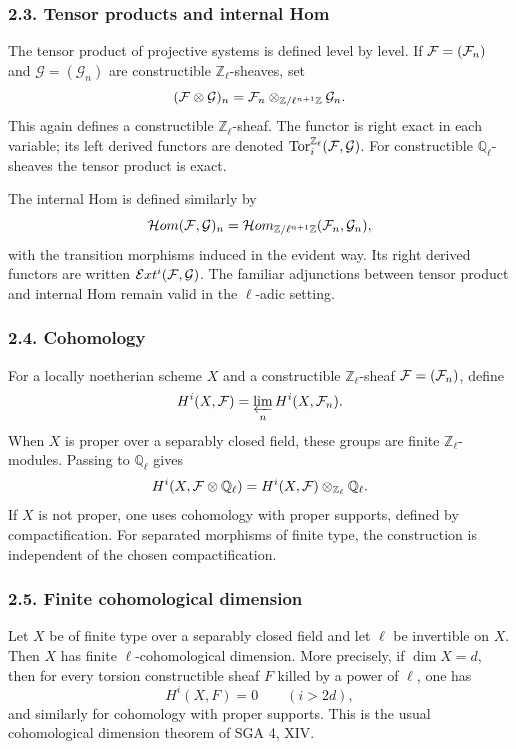 \documentclass[11pt]{article}
\theoremstyle{plain}
\theoremstyle{definition}
\theoremstyle{remark}
\newcommand{\bQ}{\mathbb Q}
\newcommand{\bZ}{\mathbb Z}
\newcommand{\cG}{\mathcal G}\newcommand{\cH}{\mathcal H}\newcommand{\cI}{\mathcal I}
\DeclareMathOperator{\Tor}{Tor}
\begin{document}
\subsubsection*{2.3. Tensor products and internal Hom}

The tensor product of projective systems is defined level by level. If
$\mathcal F=(\mathcal F_n)$ and $\cG=(\cG_n)$ are constructible $\bZ_\ell$-sheaves, set
\[
      (\cF\otimes\cG)_n=\cF_n\otimes_{\bZ/\ell^{n+1}\bZ}\cG_n.
\]
This again defines a constructible $\bZ_\ell$-sheaf. The functor is right exact in
each variable; its left derived functors are denoted $\Tor_i^{\bZ_\ell}(\cF,\cG)$.
For constructible $\bQ_\ell$-sheaves the tensor product is exact.

The internal Hom is defined similarly by
\[
      \cH om(\cF,\cG)_n=
      \cH om_{\bZ/\ell^{n+1}\bZ}(\cF_n,\cG_n),
\]
with the transition morphisms induced in the evident way. Its right derived functors
are written $\mathcal Ext^i(\cF,\cG)$. The familiar adjunctions between tensor
product and internal Hom remain valid in the $\ell$-adic setting.

\subsubsection*{2.4. Cohomology}

For a locally noetherian scheme $X$ and a constructible $\bZ_\ell$-sheaf
$\mathcal F=(\mathcal F_n)$, define
\[
      H^i(X,\mathcal F)=\varprojlim_n H^i(X,\mathcal F_n).
\]
When $X$ is proper over a separably closed field, these groups are finite
$\bZ_\ell$-modules. Passing to $\bQ_\ell$ gives
\[
      H^i(X,\cF\otimes\bQ_\ell)
      =H^i(X,\cF)\otimes_{\bZ_\ell}\bQ_\ell.
\]
If $X$ is not proper, one uses cohomology with proper supports, defined by
compactification. For separated morphisms of finite type, the construction is
independent of the chosen compactification.

\subsubsection*{2.5. Finite cohomological dimension}

Let $X$ be of finite type over a separably closed field and let $\ell$ be invertible
on $X$. Then $X$ has finite $\ell$-cohomological dimension. More precisely, if
$\dim X=d$, then for every torsion constructible sheaf $F$ killed by a power of
$\ell$, one has
\[
       H^i(X,F)=0\qquad (i>2d),
\]
and similarly for cohomology with proper supports. This is the usual cohomological
dimension theorem of SGA 4, XIV.
\end{document}
